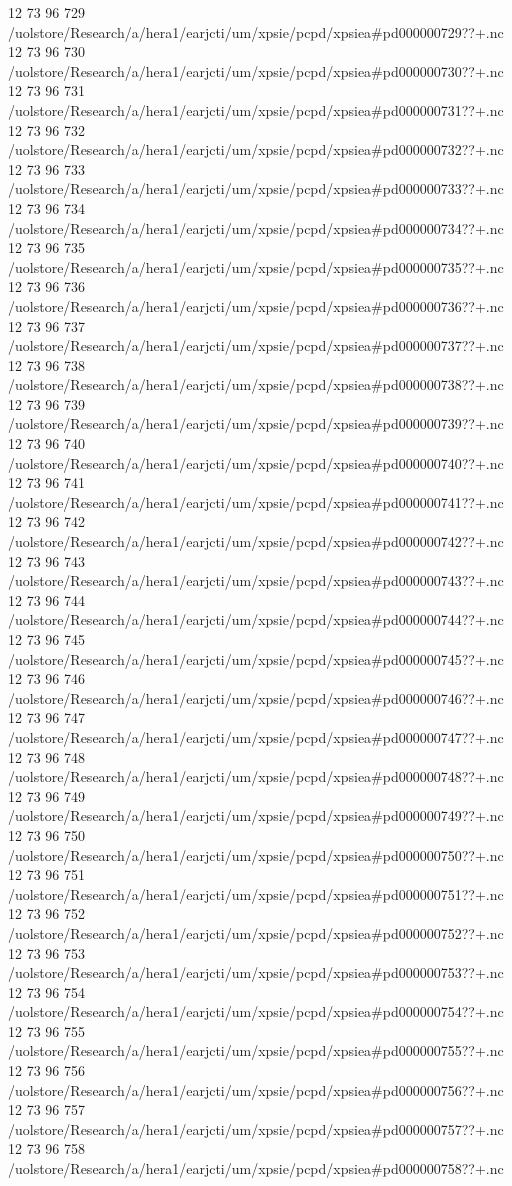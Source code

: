 12 73 96
729
/uolstore/Research/a/hera1/earjcti/um/xpsie/pcpd/xpsiea#pd000000729??+.nc
12 73 96
730
/uolstore/Research/a/hera1/earjcti/um/xpsie/pcpd/xpsiea#pd000000730??+.nc
12 73 96
731
/uolstore/Research/a/hera1/earjcti/um/xpsie/pcpd/xpsiea#pd000000731??+.nc
12 73 96
732
/uolstore/Research/a/hera1/earjcti/um/xpsie/pcpd/xpsiea#pd000000732??+.nc
12 73 96
733
/uolstore/Research/a/hera1/earjcti/um/xpsie/pcpd/xpsiea#pd000000733??+.nc
12 73 96
734
/uolstore/Research/a/hera1/earjcti/um/xpsie/pcpd/xpsiea#pd000000734??+.nc
12 73 96
735
/uolstore/Research/a/hera1/earjcti/um/xpsie/pcpd/xpsiea#pd000000735??+.nc
12 73 96
736
/uolstore/Research/a/hera1/earjcti/um/xpsie/pcpd/xpsiea#pd000000736??+.nc
12 73 96
737
/uolstore/Research/a/hera1/earjcti/um/xpsie/pcpd/xpsiea#pd000000737??+.nc
12 73 96
738
/uolstore/Research/a/hera1/earjcti/um/xpsie/pcpd/xpsiea#pd000000738??+.nc
12 73 96
739
/uolstore/Research/a/hera1/earjcti/um/xpsie/pcpd/xpsiea#pd000000739??+.nc
12 73 96
740
/uolstore/Research/a/hera1/earjcti/um/xpsie/pcpd/xpsiea#pd000000740??+.nc
12 73 96
741
/uolstore/Research/a/hera1/earjcti/um/xpsie/pcpd/xpsiea#pd000000741??+.nc
12 73 96
742
/uolstore/Research/a/hera1/earjcti/um/xpsie/pcpd/xpsiea#pd000000742??+.nc
12 73 96
743
/uolstore/Research/a/hera1/earjcti/um/xpsie/pcpd/xpsiea#pd000000743??+.nc
12 73 96
744
/uolstore/Research/a/hera1/earjcti/um/xpsie/pcpd/xpsiea#pd000000744??+.nc
12 73 96
745
/uolstore/Research/a/hera1/earjcti/um/xpsie/pcpd/xpsiea#pd000000745??+.nc
12 73 96
746
/uolstore/Research/a/hera1/earjcti/um/xpsie/pcpd/xpsiea#pd000000746??+.nc
12 73 96
747
/uolstore/Research/a/hera1/earjcti/um/xpsie/pcpd/xpsiea#pd000000747??+.nc
12 73 96
748
/uolstore/Research/a/hera1/earjcti/um/xpsie/pcpd/xpsiea#pd000000748??+.nc
12 73 96
749
/uolstore/Research/a/hera1/earjcti/um/xpsie/pcpd/xpsiea#pd000000749??+.nc
12 73 96
750
/uolstore/Research/a/hera1/earjcti/um/xpsie/pcpd/xpsiea#pd000000750??+.nc
12 73 96
751
/uolstore/Research/a/hera1/earjcti/um/xpsie/pcpd/xpsiea#pd000000751??+.nc
12 73 96
752
/uolstore/Research/a/hera1/earjcti/um/xpsie/pcpd/xpsiea#pd000000752??+.nc
12 73 96
753
/uolstore/Research/a/hera1/earjcti/um/xpsie/pcpd/xpsiea#pd000000753??+.nc
12 73 96
754
/uolstore/Research/a/hera1/earjcti/um/xpsie/pcpd/xpsiea#pd000000754??+.nc
12 73 96
755
/uolstore/Research/a/hera1/earjcti/um/xpsie/pcpd/xpsiea#pd000000755??+.nc
12 73 96
756
/uolstore/Research/a/hera1/earjcti/um/xpsie/pcpd/xpsiea#pd000000756??+.nc
12 73 96
757
/uolstore/Research/a/hera1/earjcti/um/xpsie/pcpd/xpsiea#pd000000757??+.nc
12 73 96
758
/uolstore/Research/a/hera1/earjcti/um/xpsie/pcpd/xpsiea#pd000000758??+.nc
